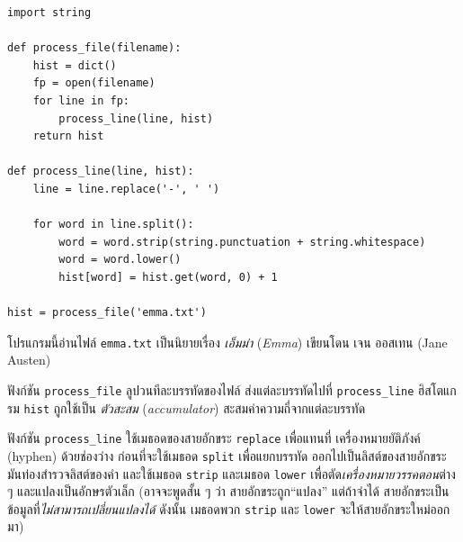 \begin{verbatim}
import string

def process_file(filename):
    hist = dict()
    fp = open(filename)
    for line in fp:
        process_line(line, hist)
    return hist

def process_line(line, hist):
    line = line.replace('-', ' ')
    
    for word in line.split():
        word = word.strip(string.punctuation + string.whitespace)
        word = word.lower()
        hist[word] = hist.get(word, 0) + 1

hist = process_file('emma.txt')
\end{verbatim}
%
%
โปรแกรมนี้อ่านไฟล์ {\tt emma.txt}
เป็นนิยายเรื่อง \textit{เอ็มม่า} (\textit{Emma}) เขียนโดน เจน ออสเทน (Jane Austen)


ฟังก์ชัน \verb|process_file| ลูปวนทีละบรรทัดของไฟล์ 
ส่งแต่ละบรรทัดไปที่ \verb|process_line|
ฮิสโตแกรม \texttt{hist} ถูกใช้เป็น \textit{ตัวสะสม} (\textit{accumulator}) สะสมค่าความถี่จากแต่ละบรรทัด


ฟังก์ชัน \verb|process_line| ใช้เมธอดของสายอักขระ \texttt{replace}
เพื่อแทนที่ เครื่องหมายยัติภังค์ (hyphen) ด้วยช่องว่าง
ก่อนที่จะใช้เมธอด \texttt{split} เพื่อแยกบรรทัด ออกไปเป็นลิสต์ของสายอักขระ
มันท่องสำรวจลิสต์ของคำ และใช้เมธอด \texttt{strip} และเมธอด \texttt{lower}
เพื่อตัด\textit{เครื่องหมายวรรคตอน}ต่าง ๆ และแปลงเป็นอักษรตัวเล็ก
(อาจจะพูดสั้น ๆ ว่า สายอักขระถูก``แปลง'' 
แต่ถ้าจำได้ สายอักขระเป็นข้อมูลที่\textit{ไม่สามารถเปลี่ยนแปลงได้}
ดังนั้น เมธอดพวก \texttt{strip} และ \texttt{lower} จะให้สายอักขระใหม่ออกมา)


